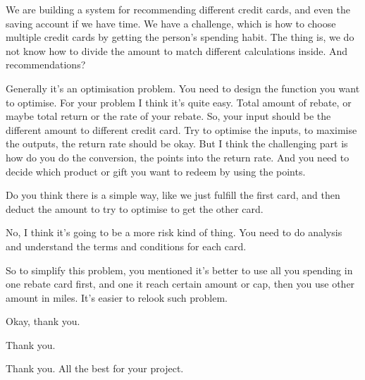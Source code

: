 \begin{description}[leftmargin=4em,style=nextline]
	\item[JH:] We are building a system for recommending different credit cards, and even the saving account if we have time. We have a challenge, which is how to choose multiple credit cards by getting the person’s spending habit. The thing is, we do not know how to divide the amount to match different calculations inside. And recommendations?

	\item[HJ:] Generally it’s an optimisation problem. You need to design the function you want to optimise. For your problem I think it’s quite easy. Total amount of rebate, or maybe total return or the rate of your rebate. So, your input should be the different amount to different credit card.  Try to optimise the inputs, to maximise the outputs, the return rate should be okay. But I think the challenging part is how do you do the conversion, the points into the return rate. And you need to decide which product or gift you want to redeem by using the points.

	\item[JH:] Do you think there is a simple way, like we just fulfill the first card, and then deduct the amount to try to optimise to get the other card.

	\item[HJ:] No, I think it’s going to be a more risk kind of thing. You need to do analysis and understand the terms and conditions for each card.

	\item[JH:] So to simplify this problem, you mentioned it’s better to use all you spending in one rebate card first, and one it reach certain amount or cap, then you use other amount in miles. It’s easier to relook such problem.

	\item[JH:] Okay, thank you.

	\item[LD:] Thank you.

	\item[HJ:] Thank you. All the best for your project.

\end{description}





